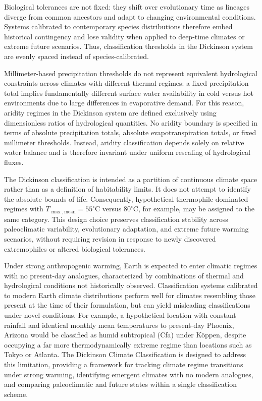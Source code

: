 \documentclass[12pt]{article}
\begin{document}
Biological tolerances are not fixed: they shift over evolutionary time as
lineages diverge from common ancestors and adapt to changing environmental
conditions. Systems calibrated to contemporary species distributions
therefore embed historical contingency and lose validity when applied to
deep-time climates or extreme future scenarios. Thus, classification thresholds in the Dickinson system are evenly spaced instead of species-calibrated.

Millimeter-based precipitation thresholds do not represent equivalent hydrological constraints across climates with different thermal regimes: a fixed precipitation total implies fundamentally different surface water availability in cold versus hot environments due to large differences in evaporative demand. For this reason, aridity regimes in the Dickinson system are defined exclusively using dimensionless ratios of hydrological quantities. No aridity boundary is specified in terms of absolute precipitation totals, absolute evapotranspiration totals, or fixed millimeter thresholds. Instead, aridity classification depends solely on relative water balance and is therefore invariant under uniform rescaling of hydrological fluxes.

The Dickinson classification is intended as a partition of continuous
climate space rather than as a definition of habitability limits. It does
not attempt to identify the absolute bounds of life. Consequently, hypothetical thermophile-dominated regimes with
$T_{\max,\mathrm{mean}} = 55^\circ\mathrm{C}$ versus $80^\circ\mathrm{C}$, for example, may be
assigned to the same category. This design choice preserves classification
stability across paleoclimatic variability, evolutionary adaptation, and
extreme future warming scenarios, without requiring revision in response
to newly discovered extremophiles or altered biological tolerances.

Under strong anthropogenic warming, Earth is expected to enter climatic regimes with no present-day analogues, characterized by combinations of thermal and hydrological conditions not historically observed. Classification systems calibrated to modern Earth climate distributions perform well for climates resembling those present at the time of their formulation, but can yield misleading classifications under novel conditions. For example, a hypothetical location with constant rainfall and identical monthly mean temperatures to present-day Phoenix, Arizona would be classified as humid subtropical (Cfa) under Köppen, despite occupying a far more thermodynamically extreme regime than locations such as Tokyo or Atlanta. The Dickinson Climate Classification is designed to address this limitation, providing a framework for tracking climate regime transitions under strong warming, identifying emergent climates with no modern analogues, and comparing paleoclimatic and future states within a single classification scheme.
\end{document}
